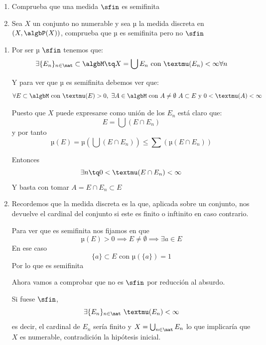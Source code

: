 \begin{problem}
\begin{enumerate}
\item Comprueba que una medida $\sfin$ es semifinita
\item Sea $X$ un conjunto no numerable y sea µ la medida discreta en $(X, \algbP (X))$, comprueba que µ es  semifinita pero no $\sfin$
\end{enumerate}

\solution
\begin{enumerate}
\item
Por ser µ $\sfin$ tenemos que:
\[\exists \{E_n\}_{n \in \nat} \subset \algbM \tq X = \bigcup E_n \text{ con } µ(E_n)< \infty \forall n\]

Y para ver que µ es semifinita debemos ver que:
\[\forall E \subset \algbM \text{ con } µ(E)>0, \ \exists A \in \algbM \text{ con } A\neq \emptyset \ A \subset E \text{ y } 0<µ(A) < \infty\]

Puesto que $X$ puede expresarse como unión de los $E_n$ está claro que:
\[E= \bigcup (E \cap E_n)\]
y por tanto
\[µ(E)=µ(\bigcup (E \cap E_n))\leq \sum(µ(E \cap E_n))\]

Entonces 
\[\exists n \tq 0<µ(E \cap E_n) < \infty\]
Y basta con tomar $A=E \cap E_n \subset E$

\item 
Recordemos que la medida discreta es la que, aplicada sobre un conjunto, nos devuelve el cardinal del conjunto si este es finito o inftinito en caso contrario.

Para ver que es semifinita nos fijamos en que
\[µ(E) > 0 \implies E \neq \emptyset \implies \exists a \in E\]
En ese caso 
\[\{a\}\subset E \text{ con } µ(\{a\})=1\]
Por lo que es semifinita 

Ahora vamos a comprobar que no es $\sfin$ por reducción al absurdo.

Si fuese $\sfin$,
\[\exists \{E_n\}_{n \in \nat} \ µ(E_n) < \infty\]
es decir, el cardinal de $E_n$ sería finito  y $X= \bigcup_{n \in \nat }E_n$ lo que implicaría que $X$ es numerable, contradición la hipótesis inicial.

\end{enumerate}
\end{problem}

